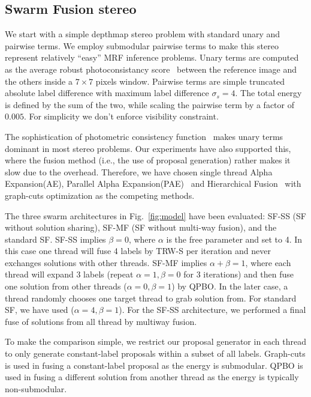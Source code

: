 \subsection{Swarm Fusion stereo}
We start with a simple depthmap stereo problem with standard unary and
pairwise terms. We employ submodular pairwise terms to make this
stereo represent relatively ``easy'' MRF inference problems.
%
Unary terms are computed as the average robust photoconsistancy
score~\cite{second_order_stereo} between the reference image and the others
inside a $7\times 7$ pixels window.  Pairwise terms are simple
truncated absolute label difference with maximum label difference
$\sigma_s=4$. The total energy is defined by the sum of the two, while
scaling the pairwise term by a factor of $0.005$. For simplicity we
don't enforce visibility constraint.

%


\noindent The sophistication of photometric consistency
function~\cite{mvs_furukawa_survey} makes unary terms dominant in most
stereo problems.  Our experiments have also supported this, where the
fusion method (i.e., the use of proposal generation) rather makes it
slow due to the overhead. Therefore, we have chosen single thread Alpha
Expansion(AE), Parallel Alpha
Expansion(PAE)~\cite{fusion_moves_for_markov_random_field_optimization}
and Hierarchical
Fusion~\cite{delong_hierarchical_fusion,olga_hierarchical_alpha_expansion}
with graph-cuts optimization as the competing methods.




\noindent The three swarm architectures in Fig.~\ref{fig:model} have
been evaluated: SF-SS (SF without solution sharing), SF-MF (SF without
multi-way fusion), and the standard SF.
%
SF-SS implies $\beta=0$, where $\alpha$ is the free parameter and set
to 4. In this case one thread will fuse 4 labels by TRW-S per
iteration and never exchanges solutions with other threads. SF-MF
implies $\alpha+\beta=1$, where each thread will expand 3 labels
(repeat $\alpha=1, \beta=0$ for 3 iterations) and then fuse one
solution from other threads ($\alpha=0, \beta=1$) by QPBO. In the later
case, a thread randomly chooses one target thread to grab solution
from. For standard SF, we have used ($\alpha=4, \beta=1$). For the
SF-SS architecture, we performed a final fuse of solutions from all
thread by multiway fusion.

%
%
%
%
To make the comparison simple, we restrict our proposal generator
in each thread to only generate constant-label proposals within a
subset of all labels. Graph-cuts is used in fusing a constant-label
proposal as the energy is submodular. QPBO is used in fusing a
different solution from another thread as the energy is typically
non-submodular.
%
